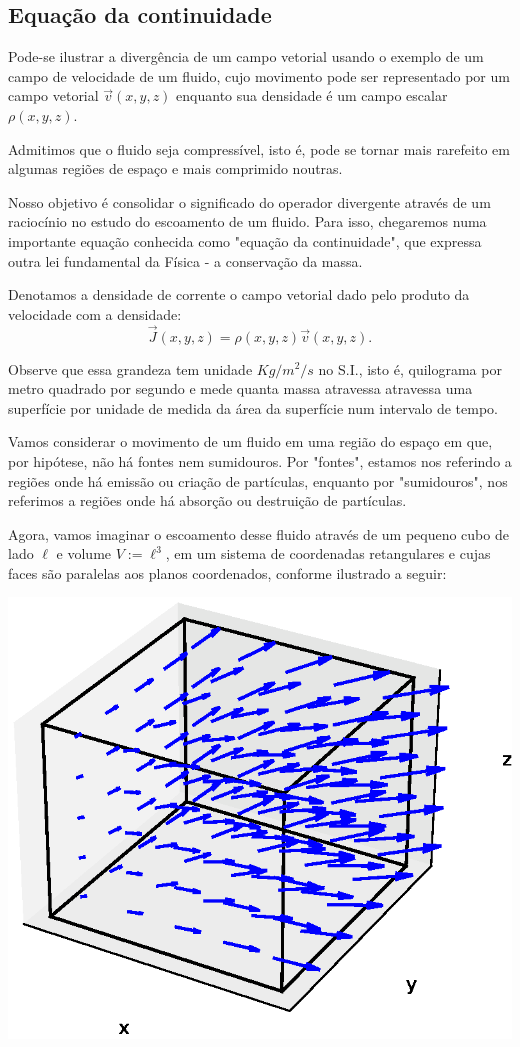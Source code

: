 \subsection{Equação da continuidade}
Pode-se ilustrar a divergência de um campo vetorial usando o exemplo de um campo de velocidade de um fluido, cujo movimento pode ser representado por um campo vetorial $\vec{v}(x, y, z)$ enquanto sua densidade é um campo escalar $\rho(x, y, z)$.

Admitimos que o fluido seja compressível, isto é, pode se tornar mais rarefeito em algumas regiões de espaço e mais comprimido noutras.

Nosso objetivo é consolidar o significado do operador divergente através de um raciocínio no estudo do escoamento de um fluido. Para isso, chegaremos numa importante equação conhecida como "equação da continuidade", que expressa outra lei fundamental da Física - a conservação da massa. 

Denotamos a densidade de corrente o campo vetorial dado pelo produto da velocidade com a densidade: 
$$\vec{J}(x, y, z) = \rho(x, y, z)\vec{v}(x, y, z).$$

Observe que essa grandeza tem unidade $Kg/m^2/s$ no S.I., isto é, quilograma por metro quadrado por segundo e mede quanta massa atravessa atravessa uma superfície por unidade de medida da área da superfície num intervalo de tempo.



Vamos considerar o movimento de um fluido em uma região do espaço em que, por hipótese, não há fontes nem sumidouros. Por "fontes", estamos nos referindo a regiões onde há emissão ou criação de partículas, enquanto por "sumidouros", nos referimos a regiões onde há absorção ou destruição de partículas.

Agora, vamos imaginar o escoamento desse fluido através de um pequeno cubo de lado $\ell$ e volume $V := \ell^3$, em um sistema de coordenadas retangulares e cujas faces são paralelas aos planos coordenados, conforme ilustrado a seguir:

\begin{center}\includegraphics[width=.5\textwidth]{cap_campos/figs/campo_com_cubo_divergente}\end{center}

